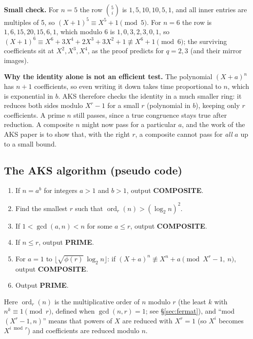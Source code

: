 \textbf{Small check.} For $n = 5$ the row $\binom{5}{i}$ is $1, 5, 10, 10, 5, 1$, and all inner entries are multiples of 5, so $(X + 1)^5 \equiv X^5 + 1 \pmod 5$. For $n = 6$ the row is $1, 6, 15, 20, 15, 6, 1$, which modulo 6 is $1, 0, 3, 2, 3, 0, 1$, so $(X + 1)^6 \equiv X^6 + 3X^4 + 2X^3 + 3X^2 + 1 \not\equiv X^6 + 1 \pmod 6$; the surviving coefficients sit at $X^2, X^3, X^4$, as the proof predicts for $q = 2, 3$ (and their mirror images).

\textbf{Why the identity alone is not an efficient test.} The polynomial $(X + a)^n$ has $n + 1$ coefficients, so even writing it down takes time proportional to $n$, which is exponential in $b$. AKS therefore checks the identity in a much smaller ring: it reduces both sides modulo $X^r - 1$ for a small $r$ (polynomial in $b$), keeping only $r$ coefficients. A prime $n$ still passes, since a true congruence stays true after reduction. A composite $n$ might now pass for a particular $a$, and the work of the AKS paper is to show that, with the right $r$, a composite cannot pass for \emph{all} $a$ up to a small bound.

\subsection{The AKS algorithm (pseudo code) \hot\new}

\begin{keybox}[title={AKS$(n)$, $n > 1$; all logarithms are base 2}]
\begin{enumerate}[leftmargin=*,align=left,itemsep=1pt,label=\textbf{Step \arabic*.}]
  \item If $n = a^b$ for integers $a > 1$ and $b > 1$, output \textbf{COMPOSITE}.
  \item Find the smallest $r$ such that $\operatorname{ord}_r(n) > (\log_2 n)^2$.
  \item If $1 < \gcd(a, n) < n$ for some $a \le r$, output \textbf{COMPOSITE}.
  \item If $n \le r$, output \textbf{PRIME}.
  \item For $a = 1$ to $\big\lfloor \sqrt{\phi(r)}\, \log_2 n \big\rfloor$: if $(X + a)^n \not\equiv X^n + a \pmod{X^r - 1,\ n}$, output \textbf{COMPOSITE}.
  \item Output \textbf{PRIME}.
\end{enumerate}
\end{keybox}
Here $\operatorname{ord}_r(n)$ is the multiplicative order of $n$ modulo $r$ (the least $k$ with $n^k \equiv 1 \pmod r$, defined when $\gcd(n, r) = 1$; see \S\ref{sec:fermat}), and ``mod $(X^r - 1, n)$'' means that powers of $X$ are reduced with $X^r = 1$ (so $X^{i}$ becomes $X^{i \bmod r}$) and coefficients are reduced modulo $n$.


